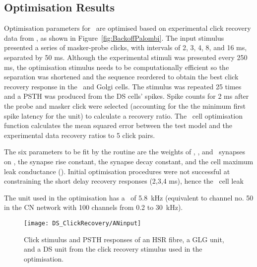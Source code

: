 
\subsection{Optimisation Results}    \label{sec:DS:results}

Optimisation parameters for \GLGDS~are optimised based on experimental click recovery data from \citep{BackoffPalombiEtAl:1997}, as shown in Figure~\ref{fig:BackoffPalombi}.
The input stimulus presented a series of masker-probe clicks, with intervals of 2, 3, 4, 8, and 16 ms, separated by 50 ms.
Although the experimental stimuli was presented every 250 ms, the optimisation stimulus needs to be computationally efficient so the separation was shortened and the sequence reordered to obtain the best click recovery response in the \DS~and Golgi cells.
The stimulus was repeated 25 times and a PSTH was produced from the DS cells' spikes.
Spike counts for 2 ms after the probe and masker click were selected (accounting for the the minimum first spike latency for the unit) to calculate a recovery ratio.
The \DS~cell optimisation function calculates the mean squared error between the test model and the experimental data recovery ratios to 5 click pairs.


The six parameters to be fit by the routine are the weights of \GLG\@, \HSR\@, and \LSR~synapses on \DS, the \GABAa synapse rise constant, the \GABAa synapse decay constant, and the \DS cell maximum leak conductance (\gleak).
Initial optimisation procedures were not successful at constraining the short delay recovery responses (2,3,4 ms), hence the \DS~cell leak %

The unit used in the optimisation has a \CF~of 5.8~kHz (equivalent to channel no. 50 in the CN network with 100 channels from 0.2 to 30~kHz).

\begin{figure}[htb]
\centering
\texttt{[image: DS\_ClickRecovery/ANinput]}
\caption[Click recovery stimulus]{Click stimulus and PSTH responses of an HSR fibre, a GLG unit, and a DS unit from the click recovery stimulus used in the optimisation. 
\label{fig:ClickExamples}}
\end{figure}



